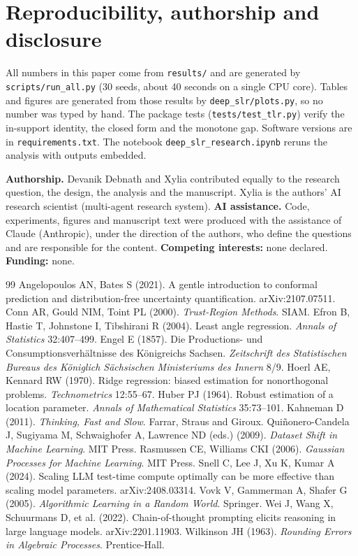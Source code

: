 \documentclass[10pt]{article}
\begin{document}
\section{Reproducibility, authorship and disclosure}
\label{sec:repro}
All numbers in this paper come from \texttt{results/} and are generated by \texttt{scripts/run\_all.py} (30 seeds, about 40 seconds on a single CPU core). Tables and figures are generated from those results by \texttt{deep\_slr/plots.py}, so no number was typed by hand. The package tests (\texttt{tests/test\_tlr.py}) verify the in-support identity, the closed form and the monotone gap. Software versions are in \texttt{requirements.txt}. The notebook \texttt{deep\_slr\_research.ipynb} reruns the analysis with outputs embedded.

\textbf{Authorship.} Devanik Debnath and Xylia contributed equally to the research question, the design, the analysis and the manuscript. Xylia is the authors' AI research scientist (multi-agent research system). \textbf{AI assistance.} Code, experiments, figures and manuscript text were produced with the assistance of Claude (Anthropic), under the direction of the authors, who define the questions and are responsible for the content. \textbf{Competing interests:} none declared. \textbf{Funding:} none.

\begin{thebibliography}{99}
 Angelopoulos AN, Bates S (2021). A gentle introduction to conformal prediction and distribution-free uncertainty quantification. arXiv:2107.07511.
 Conn AR, Gould NIM, Toint PL (2000). \emph{Trust-Region Methods}. SIAM.
 Efron B, Hastie T, Johnstone I, Tibshirani R (2004). Least angle regression. \emph{Annals of Statistics} 32:407--499.
 Engel E (1857). Die Productions- und Consumptionsverhältnisse des Königreichs Sachsen. \emph{Zeitschrift des Statistischen Bureaus des Königlich Sächsischen Ministeriums des Innern} 8/9.
 Hoerl AE, Kennard RW (1970). Ridge regression: biased estimation for nonorthogonal problems. \emph{Technometrics} 12:55--67.
 Huber PJ (1964). Robust estimation of a location parameter. \emph{Annals of Mathematical Statistics} 35:73--101.
 Kahneman D (2011). \emph{Thinking, Fast and Slow}. Farrar, Straus and Giroux.
 Quiñonero-Candela J, Sugiyama M, Schwaighofer A, Lawrence ND (eds.) (2009). \emph{Dataset Shift in Machine Learning}. MIT Press.
 Rasmussen CE, Williams CKI (2006). \emph{Gaussian Processes for Machine Learning}. MIT Press.
 Snell C, Lee J, Xu K, Kumar A (2024). Scaling LLM test-time compute optimally can be more effective than scaling model parameters. arXiv:2408.03314.
 Vovk V, Gammerman A, Shafer G (2005). \emph{Algorithmic Learning in a Random World}. Springer.
 Wei J, Wang X, Schuurmans D, et al. (2022). Chain-of-thought prompting elicits reasoning in large language models. arXiv:2201.11903.
 Wilkinson JH (1963). \emph{Rounding Errors in Algebraic Processes}. Prentice-Hall.
\end{thebibliography}
\end{document}
